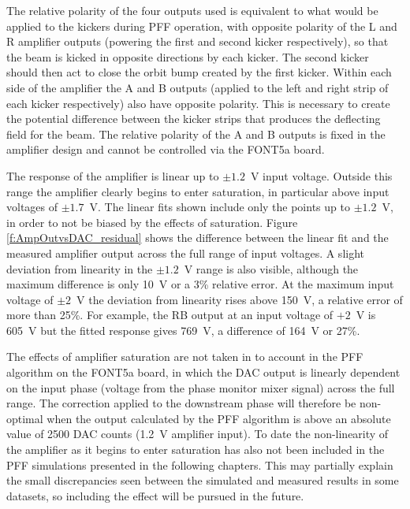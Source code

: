 The relative polarity of the four outputs used is equivalent to what would be applied to the kickers during PFF operation, with opposite polarity of the L and R amplifier outputs (powering the first and second kicker respectively), so that the beam is kicked in opposite directions by each kicker. The second kicker should then act to close the orbit bump created by the first kicker. Within each side of the amplifier the A and B outputs (applied to the left and right strip of each kicker respectively) also have opposite polarity. This is necessary to create the potential difference between the kicker strips that produces the deflecting field for the beam. The relative polarity of the A and B outputs is fixed in the amplifier design and cannot be controlled via the FONT5a board.

The response of the amplifier is linear up to \(\pm1.2\)~V input voltage. Outside this range the amplifier clearly begins to enter saturation, in particular above input voltages of \(\pm1.7\)~V. The linear fits shown include only the points up to \(\pm1.2\)~V, in order to not be biased by the effects of saturation. Figure \ref{f:AmpOutvsDAC_residual} shows the difference between the linear fit and the measured amplifier output across the full range of input voltages. A slight deviation from linearity in the \(\pm1.2\)~V range is also visible, although the maximum difference is only 10~V or a 3\% relative error. At the maximum input voltage of \(\pm2\)~V the deviation from linearity rises above 150~V,  a relative error of more than 25\%. For example, the RB output at an input voltage of \(+2\)~V is 605~V but the fitted response gives 769~V, a difference of 164~V or 27\%.

The effects of amplifier saturation are not taken in to account in the PFF algorithm on the FONT5a board, in which the DAC output is linearly dependent on the input phase (voltage from the phase monitor mixer signal) across the full range. The correction applied to the downstream phase will therefore be non-optimal when the output calculated by the PFF algorithm is above an absolute value of 2500 DAC counts (1.2~V amplifier input). To date the non-linearity of the amplifier as it begins to enter saturation has also not been included in the PFF simulations presented in the following chapters. This may partially explain the small discrepancies seen between the simulated and measured results in some datasets, so including the effect will be pursued in the future. 

